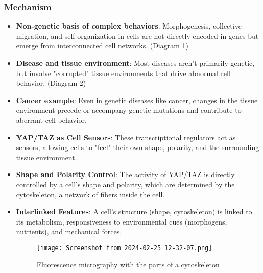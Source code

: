 \documentclass{article}
\begin{document}
\subsubsection{Mechanism}
\begin{itemize}
    \item \textbf{Non-genetic basis of complex behaviors}: Morphogenesis, collective migration, and self-organization in cells are not directly encoded in genes but emerge from interconnected cell networks. (Diagram 1)
\item \textbf{Disease and tissue environment}: Most diseases aren't primarily genetic, but involve "corrupted" tissue environments that drive abnormal cell behavior. (Diagram 2)
\item \textbf{Cancer example}: Even in genetic diseases like cancer, changes in the tissue environment precede or accompany genetic mutations and contribute to aberrant cell behavior.
\item \textbf{YAP/TAZ as Cell Sensors}: These transcriptional regulators act as sensors, allowing cells to "feel" their own shape, polarity, and the surrounding tissue environment.
\item \textbf{Shape and Polarity Control}: The activity of YAP/TAZ is directly controlled by a cell's shape and polarity, which are determined by the cytoskeleton, a network of fibers inside the cell.
\item \textbf{Interlinked Features}: A cell's structure (shape, cytoskeleton) is linked to its metabolism, responsiveness to environmental cues (morphogens, nutrients), and mechanical forces.
\begin{figure}[h]
    \centering
    \texttt{[image: Screenshot from 2024-02-25 12-32-07.png]}
    \caption{Fluorescence micrography  with the parts of a cytoskeleton}
    \label{fig:enter-label}
\end{figure}


\end{itemize}
\end{document}
